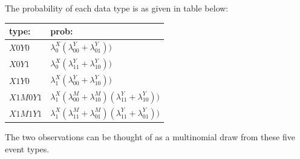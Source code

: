 \documentclass[12pt,]{book}
\begin{document}
The probability of each data type is as given in table below:

\begin{longtable}[]{@{}ll@{}}
\toprule
\begin{minipage}[b]{0.24\columnwidth}\raggedright
type:\strut
\end{minipage} & \begin{minipage}[b]{0.70\columnwidth}\raggedright
prob:\strut
\end{minipage}\tabularnewline
\midrule
\endhead
\begin{minipage}[t]{0.24\columnwidth}\raggedright
\(X0Y0\)\strut
\end{minipage} & \begin{minipage}[t]{0.70\columnwidth}\raggedright
\(\lambda^X_0(\lambda^Y_{00}+\lambda^Y_{01}))\)\strut
\end{minipage}\tabularnewline
\begin{minipage}[t]{0.24\columnwidth}\raggedright
\(X0Y1\)\strut
\end{minipage} & \begin{minipage}[t]{0.70\columnwidth}\raggedright
\(\lambda^X_0(\lambda^Y_{11}+\lambda^Y_{10}))\)\strut
\end{minipage}\tabularnewline
\begin{minipage}[t]{0.24\columnwidth}\raggedright
\(X1Y0\)\strut
\end{minipage} & \begin{minipage}[t]{0.70\columnwidth}\raggedright
\(\lambda^X_1(\lambda^Y_{00}+\lambda^Y_{10}))\)\strut
\end{minipage}\tabularnewline
\begin{minipage}[t]{0.24\columnwidth}\raggedright
\(X1M0Y1\)\strut
\end{minipage} & \begin{minipage}[t]{0.70\columnwidth}\raggedright
\(\lambda^X_1(\lambda^M_{00}+\lambda^M_{10})(\lambda^Y_{11}+\lambda^Y_{10}))\)\strut
\end{minipage}\tabularnewline
\begin{minipage}[t]{0.24\columnwidth}\raggedright
\(X1M1Y1\)\strut
\end{minipage} & \begin{minipage}[t]{0.70\columnwidth}\raggedright
\(\lambda^X_1(\lambda^M_{11}+\lambda^M_{01})(\lambda^Y_{11}+\lambda^Y_{01}))\)\strut
\end{minipage}\tabularnewline
\bottomrule
\end{longtable}

The two observations can be thought of as a multinomial draw from these five event types.
\end{document}
